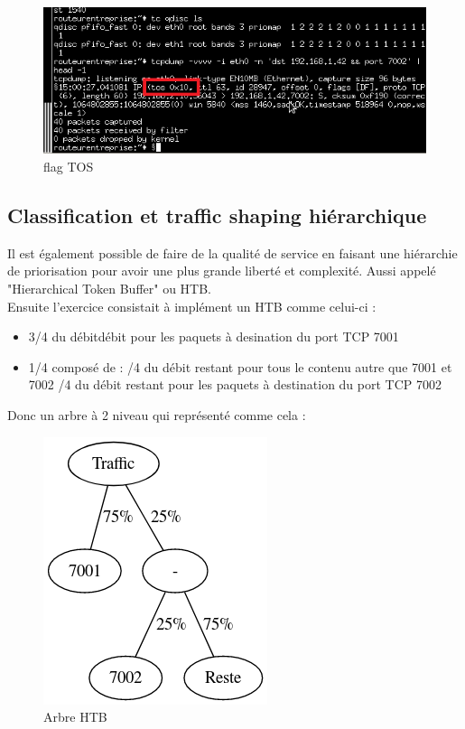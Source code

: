 \documentclass{article}
\begin{document}
\begin{figure}[h]
  \centering
  \includegraphics[width=\linewidth]{./captures/tos-Flag.png}
  \caption{flag TOS}
  \label{fig:token-bucket}
\end{figure}


\subsection{Classification et traffic shaping hiérarchique}

Il est également possible de faire de la qualité de service en faisant une hiérarchie de priorisation pour avoir une plus grande liberté et complexité. Aussi appelé "Hierarchical Token Buffer" ou HTB. \\

Ensuite l'exercice consistait à implément un HTB comme celui-ci : \\

\begin{itemize}
	\item 3/4 du débitdébit pour les paquets à desination du port TCP 7001
	\item 1/4 composé de : 
	/4 du débit restant pour tous le contenu autre que 7001 et 7002
	/4 du débit restant pour les paquets à destination du port TCP 7002
\end{itemize}

Donc un arbre à 2 niveau qui représenté comme cela :

\begin{figure}[h]
	\centering
	\includegraphics{./arbre-htb.png}
	\caption{Arbre HTB}
	\label{fig:htb-tree}
\end{figure}
\newpage
\end{document}
